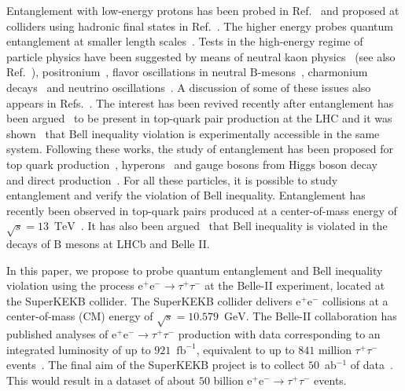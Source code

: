 \documentclass[a4paper,12pt,twocolumn]{article}
\numberwithin{equation}{section} %
\newcommand{\PB}{\ensuremath{\textrm{B}}\xspace}
\newcommand{\Pem}{\ensuremath{\textrm{e}^{-}}\xspace}
\newcommand{\Pep}{\ensuremath{\textrm{e}^{+}}\xspace}
\newcommand{\Pgtm}{\ensuremath{\tau^{-}}\xspace}
\newcommand{\Pgtp}{\ensuremath{\tau^{+}}\xspace}
\newcommand{\GeV}{\ensuremath{\textrm{GeV}}\xspace}
\newcommand{\TeV}{\ensuremath{\textrm{TeV}}\xspace}
\newcommand{\fbinv}{\ensuremath{\textrm{fb}^{-1}}\xspace}
\begin{document}
Entanglement with low-energy protons has been probed in Ref.~\cite{Lamehi-Rachti:1976wey} and proposed at colliders using hadronic final states in Ref.~\cite{Tornqvist:1980af}.
The higher energy probes quantum entanglement at smaller length scales~\cite{Abel:1992kz}. 
Tests in the high-energy regime of particle physics have been suggested by means of neutral kaon physics~\cite{Benatti:1999jt,Bertlmann:2001ea} (see also Ref.~\cite{Banerjee:2014vga}), positronium~\cite{Acin:2000cs}, flavor oscillations in neutral $\PB$-mesons~\cite{Go:2003tx}, charmonium decays~\cite{Baranov:2008zzb} and neutrino oscillations~\cite{Banerjee:2015mha}.
A discussion of some of these issues also appears in Refs.~\cite{Yongram:2013soa,Cervera-Lierta:2017tdt}. 
The interest has been revived recently after entanglement has been argued~\cite{Afik:2020onf} to be present in top-quark pair production at the LHC and it was shown~\cite{Fabbrichesi:2021npl} that Bell inequality violation is experimentally accessible in the same system. Following these works, the study of entanglement has been proposed for top quark production~\cite{Severi:2021cnj,Larkoski:2022lmv,Aguilar-Saavedra:2022uye,Afik:2022dgh,Afik:2022kwm}, hyperons~\cite{Gong:2021bcp} and gauge bosons from Higgs boson decay~\cite{Barr:2021zcp,Aguilar-Saavedra:2022wam,Ashby-Pickering:2022umy,Fabbrichesi:2023cev} and direct production~\cite{Ashby-Pickering:2022umy,Fabbrichesi:2023cev}. 
For all these particles, it is possible to study entanglement and verify the violation of Bell inequality. 
Entanglement has recently been observed in top-quark pairs produced at a center-of-mass energy of $\sqrt{s} = 13$~\TeV~\cite{ATLAS:2023fsd}.
It has also been argued~\cite{Fabbrichesi:2023idl} that Bell inequality is violated in the decays of $\PB$ mesons at LHCb and Belle II.

In this paper, we propose to probe quantum entanglement and Bell inequality violation using the process $\Pep\Pem \to \Pgtp\Pgtm$ at the Belle-II experiment, located at the SuperKEKB collider. The SuperKEKB collider delivers $\Pep\Pem$ collisions at a center-of-mass (CM) energy of $\sqrt{s} = 10.579$~\GeV. The Belle-II collaboration has published analyses of $\Pep\Pem \to \Pgtp\Pgtm$ production with data corresponding to an integrated luminosity of up to $921$~\fbinv, equivalent to up to $841$ million $\Pgtp\Pgtm$ events~\cite{Belle:2020lfn,Belle-II:2023izd}. 
The final aim of the SuperKEKB project is to collect $50$~ab$^{-1}$ of data~\cite{Akai:2018mbz,Belle-II:2018jsg}. This would result in a dataset of about $50$ billion $\Pep\Pem \to \Pgtp\Pgtm$ events.
\end{document}
